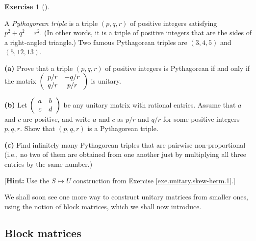 \documentclass[numbers=enddot,12pt,final,onecolumn,notitlepage]{scrartcl}%
\newcounter{exer}
\numberwithin{exer}{subsection}
\theoremstyle{definition}
\newtheorem{exmp}[exer]{Exercise}
\newenvironment{exercise}[1][]
{\begin{exmp}[#1]\begin{leftbar}}
{\end{leftbar}\end{exmp}}
\begin{document}
\begin{exercise}
\label{exe.unitary.skew-herm.pyth} A \emph{Pythagorean triple} is a
triple $\left(  p,q,r\right)  $ of positive integers satisfying $p^{2}%
+q^{2}=r^{2}$. (In other words, it is a triple of positive integers that are
the sides of a right-angled triangle.) Two famous Pythagorean triples are
$\left(  3,4,5\right)  $ and $\left(  5,12,13\right)  $. \medskip

\textbf{(a)} Prove that a triple $\left(  p,q,r\right)  $ of positive integers
is Pythagorean if and only if the matrix $\left(
\begin{array}
[c]{cc}%
p/r & -q/r\\
q/r & p/r
\end{array}
\right)  $ is unitary. \medskip

\textbf{(b)} Let $\left(
\begin{array}
[c]{cc}%
a & b\\
c & d
\end{array}
\right)  $ be any unitary matrix with rational entries. Assume that $a$ and
$c$ are positive, and write $a$ and $c$ as $p/r$ and $q/r$ for some positive
integers $p,q,r$. Show that $\left(  p,q,r\right)  $ is a Pythagorean triple.
\medskip

\textbf{(c)} Find infinitely many Pythagorean triples that are pairwise
non-proportional (i.e., no two of them are obtained from one another just by
multiplying all three entries by the same number.) \medskip

[\textbf{Hint:} Use the $S\mapsto U$ construction from Exercise
\ref{exe.unitary.skew-herm.1}.]
\end{exercise}

We shall soon see one more way to construct unitary matrices from smaller
ones, using the notion of block matrices, which we shall now introduce.

\subsection{Block matrices}
\end{document}
